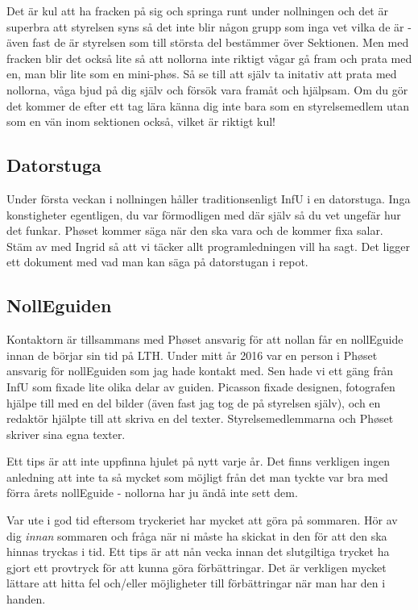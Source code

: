 \documentclass[10pt]{article}
\begin{document}
Det är kul att ha fracken på sig och springa runt under nollningen och det är superbra att styrelsen syns så det inte blir någon grupp som inga vet vilka de är - även fast de är styrelsen som till största del bestämmer över Sektionen. Men med fracken blir det också lite så att nollorna inte riktigt vågar gå fram och prata med en, man blir lite som en mini-ph\o s. Så se till att själv ta initativ att prata med nollorna, våga bjud på dig själv och försök vara framåt och hjälpsam. Om du gör det kommer de efter ett tag lära känna dig inte bara som en styrelsemedlem utan som en vän inom sektionen också, vilket är riktigt kul!

\subsection{Datorstuga}
Under första veckan i nollningen håller traditionsenligt InfU i en datorstuga. Inga konstigheter egentligen, du var förmodligen med där själv så du vet ungefär hur det funkar. Ph\o set kommer säga när den ska vara och de kommer fixa salar. Stäm av med Ingrid så att vi täcker allt programledningen vill ha sagt. Det ligger ett dokument med vad man kan säga på datorstugan i repot.

\subsection{NollEguiden}
Kontaktorn är tillsammans med Ph\o set ansvarig för att nollan får en nollEguide innan de börjar sin tid på LTH. Under mitt år 2016 var en person i Ph\o set ansvarig för nollEguiden som jag hade kontakt med. Sen hade vi ett gäng från InfU som fixade lite olika delar av guiden. Picasson fixade designen, fotografen hjälpe till med en del bilder (även fast jag tog de på styrelsen själv), och en redaktör hjälpte till att skriva en del texter. Styrelsemedlemmarna och Ph\o set skriver sina egna texter.

Ett tips är att inte uppfinna hjulet på nytt varje år. Det finns verkligen ingen anledning att inte ta så mycket som möjligt från det man tyckte var bra med förra årets nollEguide - nollorna har ju ändå inte sett dem.

Var ute i god tid eftersom tryckeriet har mycket att göra på sommaren. Hör av dig \emph{innan} sommaren och fråga när ni måste ha skickat in den för att den ska hinnas tryckas i tid. Ett tips är att nån vecka innan det slutgiltiga trycket ha gjort ett provtryck för att kunna göra förbättringar. Det är verkligen mycket lättare att hitta fel och/eller möjligheter till förbättringar när man har den i handen.
\end{document}
